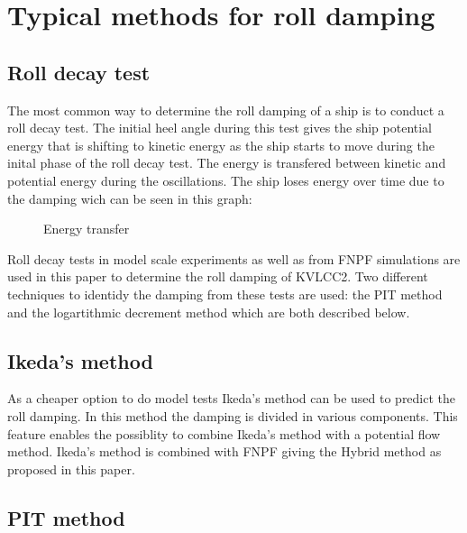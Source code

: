 \section{Typical methods for roll
damping}\label{typical-methods-for-roll-damping}

    \subsection{Roll decay test}\label{roll-decay-test}

The most common way to determine the roll damping of a ship is to
conduct a roll decay test. The initial heel angle during this test gives
the ship potential energy that is shifting to kinetic energy as the ship
starts to move during the inital phase of the roll decay test. The
energy is transfered between kinetic and potential energy during the
oscillations. The ship loses energy over time due to the damping wich
can be seen in this graph:
 
            
    
    \begin{figure}
        \begin{center}\end{center}
        \caption{Energy transfer}
        \label{fig:energy}
    \end{figure}
    

    Roll decay tests in model scale experiments as well as from FNPF
simulations are used in this paper to determine the roll damping of
KVLCC2. Two different techniques to identidy the damping from these
tests are used: the PIT method and the logartithmic decrement method
which are both described below.

\subsection{Ikeda's method}\label{ikedas-method}

As a cheaper option to do model tests Ikeda's method can be used to
predict the roll damping. In this method the damping is divided in
various components. This feature enables the possiblity to combine
Ikeda's method with a potential flow method. Ikeda's method is combined
with FNPF giving the Hybrid method as proposed in this paper.

    \subsection{PIT method}\label{pit-method}

